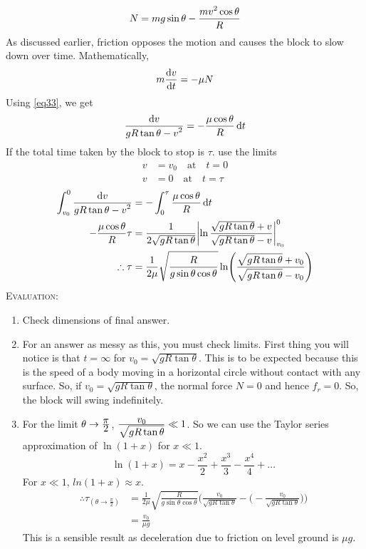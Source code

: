 \begin{equation}
N=mg\sin\theta - \frac{\displaystyle mv^2\cos\theta}{\displaystyle R} \label{eq33}
\end{equation}
As discussed earlier, friction opposes the motion and causes the block to slow down over time. Mathematically,
\begin{equation*}
m\frac{\displaystyle \mathop{}\!\mathrm{d} v}{\displaystyle \mathop{}\!\mathrm{d} t}=-\mu N
\end{equation*}
Using \eqref{eq33}, we get
\begin{equation*}
\frac{\displaystyle \mathop{}\!\mathrm{d} v}{\displaystyle gR\tan\theta - v^2}=-\frac{\displaystyle \mu \cos \theta}{\displaystyle R}\mathop{}\!\mathrm{d} t
\end{equation*}
If the total time taken by the block to stop is $\tau$. use the limits
\begin{align*}
v&=v_0 \quad \text{at} \quad t=0\\
v&=0 \quad \text{at} \quad t=\tau
\end{align*}
\begin{align*}
\int_{v_0}^0 \frac{\displaystyle \mathop{}\!\mathrm{d} v}{\displaystyle gR\tan \theta - v^2}&=-\int_0^\tau \frac{\mu \cos \theta}{R} \mathop{}\!\mathrm{d} t\\
-\frac{\mu\cos\theta}{R}\tau&= \frac{1}{2\sqrt{gR\tan\theta}}\biggl|\ln \frac{\sqrt{gR\tan\theta}+v}{\sqrt{gR\tan\theta}-v}\biggr|_{v_0}^0\\
\therefore \tau&=\frac{\displaystyle 1}{\displaystyle 2\mu}\sqrt{\frac{\displaystyle R}{\displaystyle g\sin\theta\cos\theta}}\ln \Biggl( \frac{\displaystyle \sqrt{gR\tan\theta}+v_0}{\displaystyle \sqrt{gR\tan\theta}-v_0}\Biggr)
\end{align*}
\textsc{Evaluation:}
\begin{enumerate}
\item Check dimensions of final answer.
\item For an answer as messy as this, you must check limits. First thing you will notice is that $t=\infty$ for $v_0=\sqrt{gR\tan\theta}$. This is to be expected because this is the speed of a body moving in a horizontal circle without contact with any surface. So, if $v_0=\sqrt{gR\tan\theta}$, the normal force $N=0$ and hence $f_r=0$. So, the block will swing indefinitely. 
\item For the limit $\theta \to \frac{\displaystyle \pi}{\displaystyle 2}$, $\frac{\displaystyle v_0}{\displaystyle \sqrt{gR\tan\theta}} \ll 1$. So we can use the Taylor series approximation of $\ln(1+x)$ for $x \ll 1$.
\begin{equation}
\ln(1+x)=x-\frac{x^2}{2}+\frac{x^3}{3}-\frac{x^4}{4}+\dots \label{eq34}
\end{equation}
For $x\ll 1$, $ln(1+x) \approx x$.
\begin{align*}
\therefore \tau_{ (\theta \to \frac{\pi}{2})}&= \frac{1}{2\mu} \sqrt{\frac{R}{g\sin\theta\cos\theta}}\Biggl( \frac{v_0}{\sqrt{gR\tan\theta}}-\biggl( - \frac{v_0}{\sqrt{gR\tan\theta}} \biggr) \Biggr)\\
&= \frac{v_0}{\mu g}
\end{align*}
This is a sensible result as deceleration due to friction on level ground is $\mu g$.
\end{enumerate}

